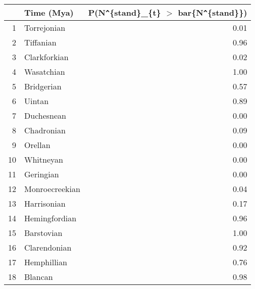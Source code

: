 \begin{table}[ht]
\centering
\begin{tabular}{rlr}
  \hline
 & Time (Mya) & P(N\verb|^|\{stand\}\_\{t\} $>$ bar\{N\verb|^|\{stand\}\}) \\ 
  \hline
1 & Torrejonian & 0.01 \\ 
  2 & Tiffanian & 0.96 \\ 
  3 & Clarkforkian & 0.02 \\ 
  4 & Wasatchian & 1.00 \\ 
  5 & Bridgerian & 0.57 \\ 
  6 & Uintan & 0.89 \\ 
  7 & Duchesnean & 0.00 \\ 
  8 & Chadronian & 0.09 \\ 
  9 & Orellan & 0.00 \\ 
  10 & Whitneyan & 0.00 \\ 
  11 & Geringian & 0.00 \\ 
  12 & Monroecreekian & 0.04 \\ 
  13 & Harrisonian & 0.17 \\ 
  14 & Hemingfordian & 0.96 \\ 
  15 & Barstovian & 1.00 \\ 
  16 & Clarendonian & 0.92 \\ 
  17 & Hemphillian & 0.76 \\ 
  18 & Blancan & 0.98 \\ 
   \hline
\end{tabular}
\label{tab:div_peak}
\end{table}
